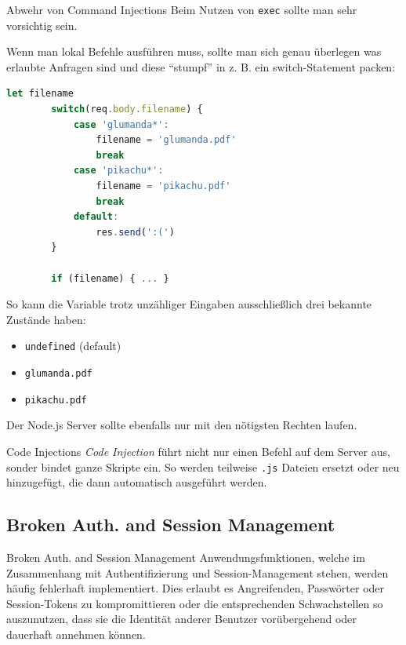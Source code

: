 \begin{bonus}{Abwehr von Command Injections}
    Beim Nutzen von \texttt{exec} sollte man sehr vorsichtig sein.

    Wenn man lokal Befehle ausführen muss, sollte man sich genau überlegen was erlaubte Anfragen sind und diese \enquote{stumpf} in z. B. ein switch-Statement packen:
    \begin{lstlisting}[language=JavaScript]
        let filename
        switch(req.body.filename) {
            case 'glumanda*':
                filename = 'glumanda.pdf'
                break
            case 'pikachu*':
                filename = 'pikachu.pdf'
                break
            default:
                res.send(':(')
        }

        if (filename) { ... }
    \end{lstlisting}

    So kann die Variable trotz unzähliger Eingaben ausschließlich drei bekannte Zustände haben:
    \begin{itemize}
        \item \texttt{undefined} (default)
        \item \texttt{glumanda.pdf}
        \item \texttt{pikachu.pdf}
    \end{itemize}

    Der Node.js Server sollte ebenfalls nur mit den nötigsten Rechten laufen.
\end{bonus}

\begin{defi}{Code Injections}
    \emph{Code Injection} führt nicht nur einen Befehl auf dem Server aus, sonder bindet ganze Skripte ein.
    So werden teilweise \texttt{.js} Dateien ersetzt oder neu hinzugefügt, die dann automatisch ausgeführt werden.
\end{defi}

\subsection{Broken Auth. and Session Management}

\begin{defi}{Broken Auth. and Session Management}
    Anwendungsfunktionen, welche im Zusammenhang mit Authentifizierung und Session-Management stehen, werden häufig fehlerhaft implementiert.
    Dies erlaubt es Angreifenden, Passwörter oder Session-Tokens zu kompromittieren oder die entsprechenden Schwachstellen so auszunutzen, dass sie die Identität anderer Benutzer vorübergehend oder dauerhaft annehmen können.
\end{defi}

